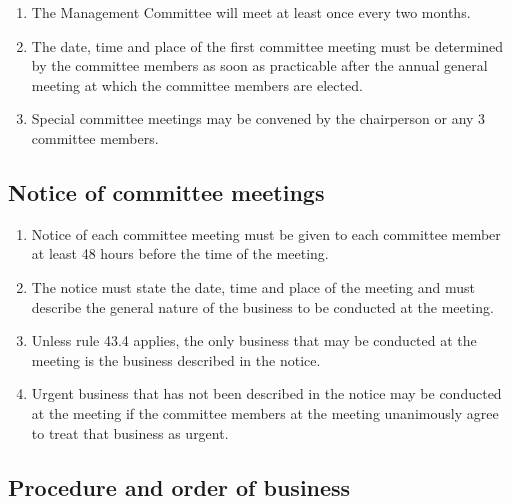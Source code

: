 \documentclass[../constitution.tex]{subfiles}
\begin{document}
\begin{enumerate}

\item The Management Committee will meet at least once every two months.
\item The date, time and place of the first committee meeting must be determined by the committee members as soon as practicable after the annual general meeting at which the committee members are elected.
\item Special committee meetings may be convened by the chairperson or any 3 committee members.
\end{enumerate}

\hypertarget{notice-of-committee-meetings}{%
\subsection{Notice of committee meetings}\label{notice-of-committee-meetings}}

\begin{enumerate}

\item Notice of each committee meeting must be given to each committee member at least 48 hours before the time of the meeting.
\item The notice must state the date, time and place of the meeting and must describe the general nature of the business to be conducted at the meeting.
\item Unless rule 43.4 applies, the only business that may be conducted at the meeting is the business described in the notice.
\item Urgent business that has not been described in the notice may be conducted at the meeting if the committee members at the meeting unanimously agree to treat that business as urgent.
\end{enumerate}

\hypertarget{procedure-and-order-of-business}{%
\subsection{Procedure and order of business}\label{procedure-and-order-of-business}}
\end{document}
